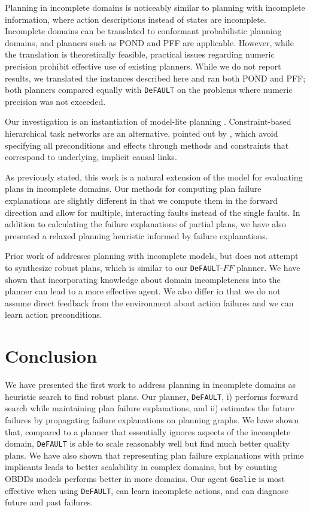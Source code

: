 \documentclass{article}
\def\citep#1{\cite{#1}}
\def\citet#1{\citeA{#1}}
\def\FFRISKY{{\tt DeFAULT}}
\def\goalie{{\tt Goalie}}
\begin{document}
Planning in incomplete domains is noticeably similar to planning with incomplete information, where action descriptions instead of states are incomplete.  Incomplete domains can be translated to conformant probabilistic planning domains, and planners such as POND \citep{aij-mclug} and PFF \citep{pff} are applicable.  However, while the translation is theoretically feasible, practical issues regarding numeric precision prohibit effective use of existing planners.  While we do not report results, we translated the instances described here and ran both POND and PFF; both planners compared equally with \FFRISKY{} on the problems where numeric precision was not exceeded.

Our investigation is an instantiation of model-lite planning \citep{modellite}.  Constraint-based hierarchical task networks are an alternative, pointed out by \citet{modellite},  which avoid specifying all preconditions and effects through methods and constraints that correspond to underlying, implicit causal links.

As previously stated, this work is a natural extension of the \citet{Garland02} model for evaluating plans in incomplete domains.  Our methods for computing plan failure explanations are slightly different in that we compute them in the forward direction and allow for multiple, interacting faults instead of the single faults.  In addition to calculating the failure explanations of partial plans, we have also presented a relaxed planning heuristic informed by failure explanations.

Prior work of \citet{DBLP:conf/aips/ChangA06} addresses planning with incomplete models, but does not attempt to synthesize robust plans, which is similar to our \FFRISKY{}-$FF$ planner.  We have shown that incorporating knowledge about domain incompleteness into the planner can lead to a more effective agent.  We also differ in that we do not assume direct feedback from the environment about action failures and we can learn action preconditions.

\section{Conclusion}

We have presented the first work to address planning in incomplete domains as heuristic search to find robust plans.  Our planner, \FFRISKY{}, i) performs forward search while maintaining plan failure explanations, and ii) estimates the future failures by propagating failure explanations on planning graphs.  We have shown that, compared to a planner that essentially ignores aspects of the incomplete domain, \FFRISKY{} is able to scale reasonably well but find much better quality plans.  We have also shown that representing plan failure explanations with prime implicants leads to better scalability in complex domains, but by counting OBDDs models performs better in more domains.  Our agent \goalie{} is most effective when using \FFRISKY{}, can learn  incomplete actions, and can diagnose future and past failures.
\end{document}
